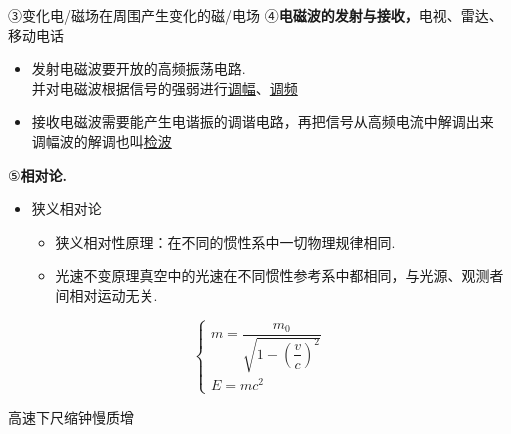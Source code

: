 ③\quad 变化电/磁场在周围产生变化的磁/电场 %
④\quad \textbf{电磁波的发射与接收，}\quad 电视、雷达、移动电话
\begin{itemize}
\item 发射电磁波要开放的高频振荡电路.\\ 并对电磁波根据信号的强弱进行\underline{调幅}、\underline{调频} %
\item 接收电磁波需要能产生电谐振的调谐电路，再把信号从高频电流中解调出来\\ 调幅波的解调也叫\underline{检波} %
\end{itemize}
⑤\quad \textbf{相对论.}
\begin{itemize}
\item 狭义相对论
 \begin{itemize}
 \item 狭义相对性原理：在不同的惯性系中一切物理规律相同. %
 \item 光速不变原理\quad 真空中的光速在不同惯性参考系中都相同，与光源、观测者间相对运动无关.
 \end{itemize}
\end{itemize}
\[ \left\{\begin{array}{l} m=\dfrac{m_0}{\sqrt{1-\left(\dfrac{v}{c}\right)^{2}}} \\[3ex] E=mc^{2} \end{array}\right. \]

高速下\quad 尺缩\quad 钟慢\quad 质增 %
